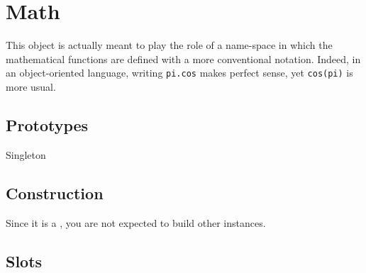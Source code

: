 
\section{Math}

This object is actually meant to play the role of a name-space in
which the mathematical functions are defined with a more conventional
notation.  Indeed, in an object-oriented language, writing
\lstinline|pi.cos| makes perfect sense, yet \lstinline|cos(pi)| is
more usual.

\subsection{Prototypes}
\begin{refObjects}
\item[Singleton]
\end{refObjects}

\subsection{Construction}

Since it is a , you are not expected to build
other instances.

\subsection{Slots}

